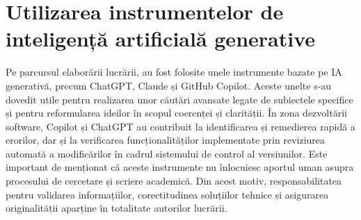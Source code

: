 \section{Utilizarea instrumentelor de inteligență artificială generative}
\label{section:ch1sec4}
Pe parcursul elaborării lucrării, au fost folosite unele instrumente bazate pe IA generativă, precum ChatGPT, Claude și GitHub Copilot.
Aceste unelte s-au dovedit utile pentru realizarea unor căutări avansate legate de subiectele specifice și pentru reformularea ideilor în scopul coerenței și clarității.
În zona dezvoltării software, Copilot și ChatGPT au contribuit la identificarea și remedierea rapidă a erorilor, dar și la verificarea funcționalităților implementate prin reviziurea automată a modificărilor în cadrul sistemului de control al versiunilor.
Este important de menționat că aceste instrumente nu înlocuiesc aportul uman asupra procesului de cercetare și scriere academică.
Din acest motiv, responsabilitatea pentru validarea informațiilor, corectitudinea soluțiilor tehnice și asigurarea originalității aparține în totalitate autorilor lucrării.


